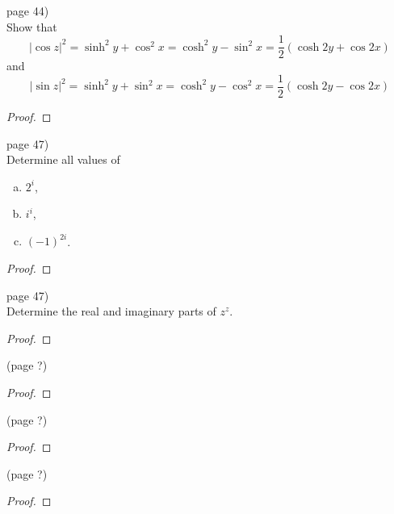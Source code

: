\documentclass{article}
\newenvironment{problem}[2][Problem]{\begin{trivlist}
\item[\hskip \labelsep {\bfseries #1}\hskip \labelsep {\bfseries #2.}]}{\end{trivlist}}
\begin{document}
\begin{problem}{4} (page 44) \\
  Show that \[
    |\cos z|^2
    = \sinh^2 y + \cos^2 x
    = \cosh^2 y - \sin^2 x
    = \frac{1}{2}(\cosh 2y + \cos 2x)
  \] and \[
    |\sin z|^2
    = \sinh^2 y + \sin^2 x
    = \cosh^2 y - \cos^2 x
    = \frac{1}{2}(\cosh 2y - \cos 2x)
  \]
\end{problem}

\begin{proof}
\end{proof}

\pagebreak

\begin{problem}{6} (page 47) \\
  Determine all values of \begin{enumerate}[(a)]
    \item $2^i$,
    \item $i^i$,
    \item $(-1)^{2i}$.
  \end{enumerate}
\end{problem}

\begin{proof}
\end{proof}

\pagebreak

\begin{problem}{7} (page 47) \\
  Determine the real and imaginary parts of $z^z$.
\end{problem}

\begin{proof}
\end{proof}

\pagebreak

\begin{problem}{?} (page ?) \\
\end{problem}

\begin{proof}
\end{proof}

\pagebreak

\begin{problem}{?} (page ?) \\
\end{problem}

\begin{proof}
\end{proof}

\pagebreak

\begin{problem}{?} (page ?) \\
\end{problem}

\begin{proof}
\end{proof}
\end{document}
